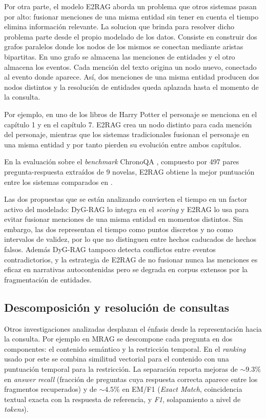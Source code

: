 Por otra parte, el modelo E2RAG aborda un problema que otros sistemas pasan por alto: fusionar menciones de una misma entidad sin tener en cuenta el tiempo elimina información relevante.  La solucion que brinda para resolver dicho problema parte desde el propio modelado de los datos. Consiste en construir dos grafos paralelos donde los nodos de los mismos se conectan mediante aristas bipartitas. En uno grafo se almacena las menciones de entidades y el otro almacena los eventos. Cada mención del texto origina un nodo nuevo, conectado al evento donde aparece. Así, dos menciones de una misma entidad producen dos nodos distintos y la resolución de entidades queda aplazada hasta el momento de la consulta.

Por ejemplo, en uno de los libros de Harry Potter el personaje se menciona en el capítulo 1 y en el capítulo 7. E2RAG crea un nodo distinto para cada mención del personaje, mientras que los sistemas tradicionales fusionan el personaje en una misma entidad y por tanto pierden su evolución entre ambos capítulos.

En la evaluación sobre el \emph{benchmark} ChronoQA \cite{e2rag2025}, compuesto por 497 pares pregunta-respuesta extraídos de 9 novelas, E2RAG obtiene la mejor puntuación entre los sistemas comparados en \cite{e2rag2025} .

Las dos propuestas que se están analizando convierten el tiempo en un factor activo del modelado: DyG-RAG lo integra en el \emph{scoring} y E2RAG lo usa para evitar fusionar menciones de una misma entidad en momentos distintos. Sin embargo, las dos representan el tiempo como puntos discretos y no como intervalos de validez, por lo que no distinguen entre hechos caducados de hechos falsos. Además DyG-RAG tampoco detecta conflictos entre eventos contradictorios, y la estrategia de E2RAG de no fusionar nunca las menciones es eficaz en narrativas autocontenidas pero se degrada en corpus extensos por la fragmentación de entidades.

\subsection{Descomposición y resolución de consultas}

Otros investigaciones analizadas desplazan el énfasis desde la representación hacia la consulta. Por ejemplo en MRAG \cite{mrag2025} se descompone cada pregunta en dos componentes: el contenido semántico y la restricción temporal. En el \emph{ranking} usado por este se combina similitud vectorial para el contenido con una puntuación temporal para la restricción. La separación reporta mejoras de ${\sim}9.3\%$ en \emph{answer recall} (fracción de preguntas cuya respuesta correcta aparece entre los fragmentos recuperados) y de ${\sim}4.5\%$ en EM/F1 (\emph{Exact Match}, coincidencia textual exacta con la respuesta de referencia, y \emph{F1}, solapamiento a nivel de \emph{tokens}).

